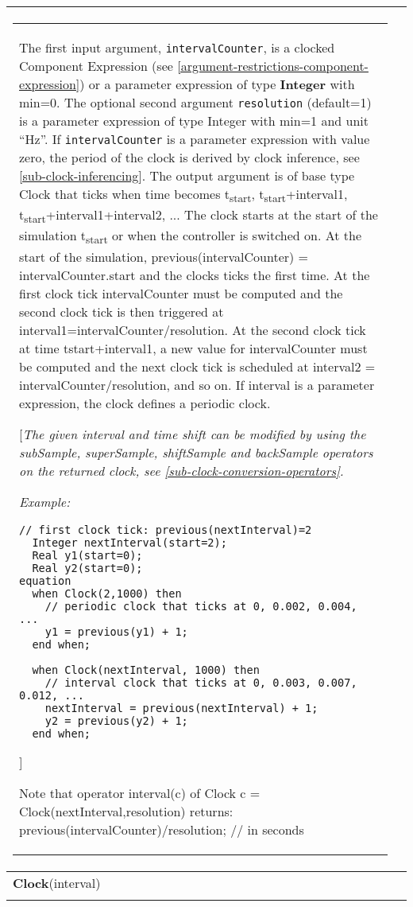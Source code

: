 \begin{longtable}[]{|p{3cm}|p{12cm}|}
\begin{tabular}{@{}p{119mm}@{}}
The first input argument, \lstinline[basicstyle=\ttfamily]!intervalCounter!, is a clocked Component
Expression (see \autoref{argument-restrictions-component-expression}) or a parameter expression of type
\textbf{Integer} with min=0. The optional second argument \lstinline[basicstyle=\ttfamily]!resolution!
(default=1) is a parameter expression of type Integer with min=1 and
unit ``Hz''. If \lstinline[basicstyle=\ttfamily]!intervalCounter! is a parameter expression with value
zero, the period of the clock is derived by clock inference, see 
\autoref{sub-clock-inferencing}. The output argument is of base type Clock that ticks when time
becomes t\textsubscript{start}, t\textsubscript{start}+interval1,
t\textsubscript{start}+interval1+interval2, ... The clock starts at the
start of the simulation t\textsubscript{start} or when the controller is
switched on. At the start of the simulation, previous(intervalCounter) =
intervalCounter.start and the clocks ticks the first time. At the first
clock tick intervalCounter must be computed and the second clock tick is
then triggered at interval1=intervalCounter/resolution. At the second
clock tick at time tstart+interval1, a new value for intervalCounter
must be computed and the next clock tick is scheduled at interval2 =
intervalCounter/resolution, and so on. If interval is a parameter
expression, the clock defines a periodic clock.

{[}\emph{The given interval and time shift can be modified by using the
subSample, superSample, shiftSample and backSample operators on the
returned clock, see \autoref{sub-clock-conversion-operators}.}

\emph{Example:}
\begin{lstlisting}[language=modelica]
  // first clock tick: previous(nextInterval)=2    
  Integer nextInterval(start=2);    
  Real y1(start=0);    
  Real y2(start=0); 
equation   
  when Clock(2,1000) then      
    // periodic clock that ticks at 0, 0.002, 0.004, ...      
    y1 = previous(y1) + 1;   
  end when; 
 
  when Clock(nextInterval, 1000) then      
    // interval clock that ticks at 0, 0.003, 0.007, 0.012, ...     
    nextInterval = previous(nextInterval) + 1;     
    y2 = previous(y2) + 1;   
  end when; 
\end{lstlisting}
{]}

Note that operator interval(c) of Clock c =
Clock(nextInterval,resolution) returns:\newline
previous(intervalCounter)/resolution; // in seconds
\end{tabular}\\ \hline
\textbf{Clock}(interval)
&
\begin{tabular}{@{}p{119mm}@{}}
\textbf{Clock with Real Interval}\\


\end{tabular}
\end{longtable}
